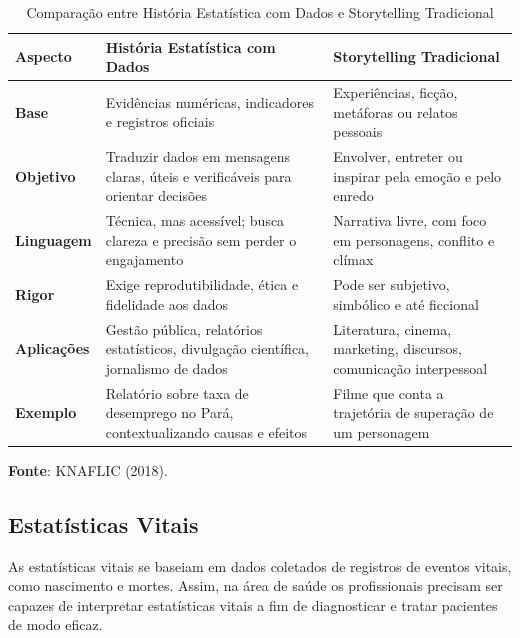 \begin{table}[H]
\centering
\caption{Comparação entre História Estatística com Dados e Storytelling Tradicional}
\label{tab:historia_vs_storytelling}
\begin{tabular}{|p{3.5cm}|p{4.2cm}|p{4.2cm}|}
\hline
\textbf{Aspecto} & \textbf{História Estatística com Dados} & \textbf{Storytelling Tradicional} \\ \hline
\textbf{Base} & Evidências numéricas, indicadores e registros oficiais & Experiências, ficção, metáforas ou relatos pessoais \\ \hline
\textbf{Objetivo} & Traduzir dados em mensagens claras, úteis e verificáveis para orientar decisões & Envolver, entreter ou inspirar pela emoção e pelo enredo \\ \hline
\textbf{Linguagem} & Técnica, mas acessível; busca clareza e precisão sem perder o engajamento & Narrativa livre, com foco em personagens, conflito e clímax \\ \hline
\textbf{Rigor} & Exige reprodutibilidade, ética e fidelidade aos dados & Pode ser subjetivo, simbólico e até ficcional \\ \hline
\textbf{Aplicações} & Gestão pública, relatórios estatísticos, divulgação científica, jornalismo de dados & Literatura, cinema, marketing, discursos, comunicação interpessoal \\ \hline
\textbf{Exemplo} & Relatório sobre taxa de desemprego no Pará, contextualizando causas e efeitos & Filme que conta a trajetória de superação de um personagem \\ \hline
\end{tabular}
\begin{flushleft}
\footnotesize \textbf{Fonte}: KNAFLIC (2018).
\end{flushleft}
\end{table}



\newpage
\subsection{Estatísticas Vitais}

As estatísticas vitais se baseiam em dados coletados de registros de eventos vitais, como nascimento e mortes. Assim, na área de saúde os profissionais precisam ser capazes de interpretar  estatísticas vitais a fim de diagnosticar e tratar pacientes de modo eficaz.

